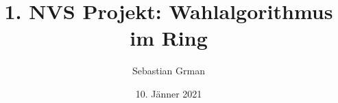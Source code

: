 \documentclass{article}
\begin{document}
\clearpage
\thispagestyle{empty}
\author{Sebastian Grman}
\date{10. Jänner 2021}
\title{1. NVS Projekt: Wahlalgorithmus im Ring}
\maketitle
\clearpage
{}
\tableofcontents
\newpage






\printbibliography
\end{document}

